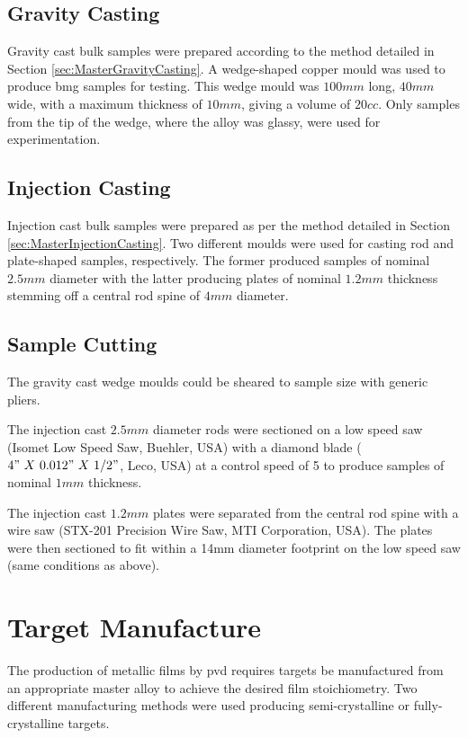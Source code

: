 \subsection{Gravity Casting}
Gravity cast bulk samples were prepared according to the method detailed in Section \ref{sec:MasterGravityCasting}. A wedge-shaped copper mould was used to produce \gls{bmg} samples for testing. This wedge mould was $100mm$ long, $40mm$ wide, with a maximum thickness of $10mm$, giving a volume of $20cc$. Only samples from the tip of the wedge, where the alloy was glassy, were used for experimentation. 

\subsection{Injection Casting}
Injection cast bulk samples were prepared as per the method detailed in Section \ref{sec:MasterInjectionCasting}. Two different moulds were used for casting rod and plate-shaped samples, respectively. The former produced samples of nominal $2.5 mm$ diameter with the latter producing plates of nominal $1.2 mm$ thickness stemming off a central rod spine of $4 mm$ diameter.  

\subsection{Sample Cutting}
The gravity cast wedge moulds could be sheared to sample size with generic pliers. 

The injection cast $2.5mm$ diameter rods were sectioned on a low speed saw (Isomet Low Speed Saw, Buehler, USA) with a diamond blade ($4"~ X~ 0.012"~ X~ 1/2"$, Leco, USA) at a control speed of 5 to produce samples of nominal $1mm$ thickness. 

The injection cast $1.2mm$ plates were separated from the central rod spine with a wire saw (STX-201 Precision Wire Saw, MTI Corporation, USA). The plates were then sectioned to fit within a 14mm diameter footprint on the low speed saw (same conditions as above). 

\section{Target Manufacture} 
The production of metallic films by \gls{pvd} requires targets be manufactured from an appropriate master alloy to achieve the desired film stoichiometry. Two different manufacturing methods were used producing semi-crystalline or fully-crystalline targets.


